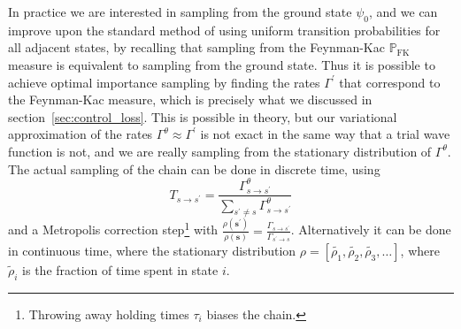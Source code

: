 In practice we are interested in sampling from the ground state $\psi_0$, and we can improve upon the standard method of using uniform transition probabilities for all adjacent states, by recalling that sampling from the Feynman-Kac $\mathbb{P}_\text{FK}$ measure is equivalent to sampling from the ground state. Thus it is possible to achieve optimal importance sampling by finding the rates $\Gamma^\prime$ that correspond to the Feynman-Kac measure, which is precisely what we discussed in section~\ref{sec:control_loss}. This is possible in theory, but our variational approximation of the rates $\Gamma^{\theta} \approx \Gamma^\prime$ is not exact in the same way that a trial wave function is not, and we are really sampling from the stationary distribution of $\Gamma^\theta$. The actual sampling of the chain can be done in discrete time, using
\begin{equation}
	T_{s \rightarrow s^{\prime}}=\frac{\Gamma_{s \rightarrow s^{\prime}}^{\theta}}{\sum_{s^{\prime} \neq s} \Gamma_{s \rightarrow s^{\prime}}^{\theta}}
\end{equation}
and a Metropolis correction step\footnote{Throwing away holding times $\tau_i$ biases the chain.} with ${\frac{\rho\left(\boldsymbol{s}^{\prime}\right)}{\rho(\boldsymbol{s})}} = \frac{\Gamma_{s \rightarrow s^{\prime}}}{\Gamma_{s^{\prime} \rightarrow s}}$. Alternatively it can be done in continuous time, where the stationary distribution $\rho = \left[ \tilde{\rho_1}, \tilde{\rho_2}, \tilde{\rho_3}, \ldots \right]$, where $\tilde \rho_i$ is the fraction of time spent in state $i$.

